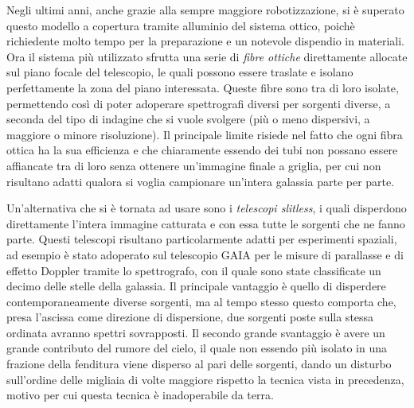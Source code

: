 Negli ultimi anni, anche grazie alla sempre maggiore robotizzazione, si è superato questo modello a copertura tramite alluminio del sistema ottico, poichè richiedente molto tempo per la preparazione e un notevole dispendio in materiali. Ora il sistema più utilizzato sfrutta una serie di \textit{fibre ottiche} direttamente allocate sul piano focale del telescopio, le quali possono essere traslate e isolano perfettamente la zona del piano interessata. Queste fibre sono tra di loro isolate, permettendo così di poter adoperare spettrografi diversi per sorgenti diverse, a seconda del tipo di indagine che si vuole svolgere (più o meno dispersivi, a maggiore o minore risoluzione). Il principale limite risiede nel fatto che ogni fibra ottica ha la sua efficienza e che chiaramente essendo dei tubi non possano essere affiancate tra di loro senza ottenere un'immagine finale a griglia, per cui non risultano adatti qualora si voglia campionare un'intera galassia parte per parte.

Un'alternativa che si è tornata ad usare sono i \textit{telescopi slitless}, i quali disperdono direttamente l'intera immagine catturata e con essa tutte le sorgenti che ne fanno parte. Questi telescopi risultano particolarmente adatti per esperimenti spaziali, ad esempio è stato adoperato sul telescopio GAIA per le misure di parallasse e di effetto Doppler tramite lo spettrografo, con il quale sono state classificate un decimo delle stelle della galassia. Il principale vantaggio è quello di disperdere contemporaneamente diverse sorgenti, ma al tempo stesso questo comporta che, presa l'ascissa come direzione di dispersione, due sorgenti poste sulla stessa ordinata avranno spettri sovrapposti. Il secondo grande svantaggio è avere un grande contributo del rumore del cielo, il quale non essendo più isolato in una frazione della fenditura viene disperso al pari delle sorgenti, dando un disturbo sull'ordine delle migliaia di volte maggiore rispetto la tecnica vista in precedenza, motivo per cui questa tecnica è inadoperabile da terra.

